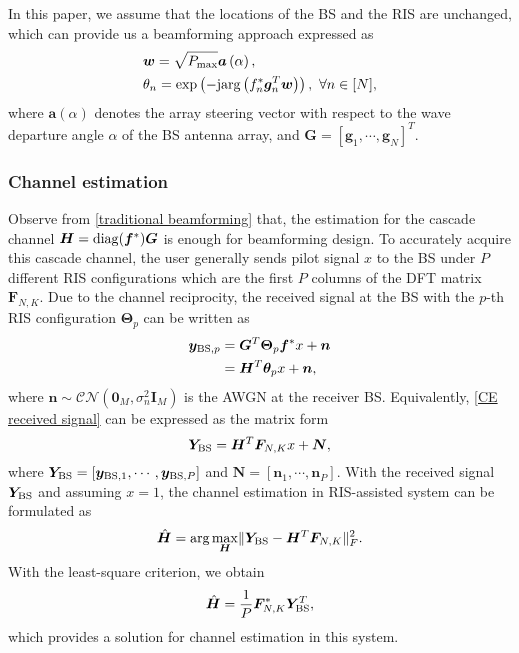 \documentclass[12pt,draftclsnofoot,journal,onecolumn]{IEEEtran}
\theoremstyle{nonumberplain}
\def \exp {\text{exp}}
\def \arg {\text{arg}}
\begin{document}
        
        In this paper, we assume that the locations of the \ac{BS} and the RIS are unchanged, which can provide us a beamforming approach expressed as
                \begin{subequations}
\label{traditional beamforming}
\begin{align}
\label{w_optimal}
&\bm w=\sqrt{P_{\rm max}}\bm a\left(\alpha\right),\\
\label{theta_optimal}
&\theta_{n} = \exp\left(-{\rm j} \arg\left(f_{n}^{*}\bm g_{n}^{T}\bm w\right)\right),~\forall n\in [N],
\end{align}
\end{subequations}
where $\bm a(\alpha)$ denotes the array steering vector with respect to the wave departure angle $\alpha$ of the BS antenna array, and $\bm G = \left[\bm g_{1}, \cdots, \bm g_{N}\right]^{T}$.

\subsubsection{Channel estimation}
Observe from \eqref{traditional beamforming} that, the estimation for the cascade channel ${\bm H} = {\rm diag}({\bm f}^{*})\bm G$ is enough for beamforming design.
To accurately acquire this cascade channel, the user generally sends pilot signal $x$ to the BS under $P$ different RIS configurations which are the first $P$ columns of the DFT matrix $\bm F_{N,K}$. Due to the channel reciprocity, the received signal at the BS with the $p$-th RIS configuration $\bm \Theta_{p}$ can be written as \cite{atapattu2020reconfigurable}
    \begin{equation}
    \label{CE received signal}
    \begin{aligned}
            {\bm y}_{{\rm BS}, p} &={\bm G}^{T} {\bm \Theta}_p\bm f^{*} x+\bm n
            \\&=\bm H^{T} {\bm \theta}_p x+\bm n,
    \end{aligned}
    \end{equation}
    where $\bm n\sim \mathcal{CN}\left( \bm 0_{M}, \sigma_{n}^{2}\bm I_{M}\right)$ is the \ac{AWGN} at the receiver BS.
Equivalently, \eqref{CE received signal} can be expressed as the matrix form
    \begin{equation}
    \label{eqn:MMSE_CE}
        {\bm Y}_{\rm BS}=\bm H^{T} \bm F_{N,K}x + {\bm N},
    \end{equation}
    where ${\bm Y}_{\rm BS}=\left[\bm y_{{\rm BS}, 1},\cdots,\bm y_{{\rm BS}, P}\right]$ and $\bm N = \left[ \bm n_{1},\cdots,\bm n_{P}\right]$.
With the received signal $\bm Y_{\rm BS}$ and assuming $x=1$, the channel estimation in RIS-assisted system can be formulated as 
    \begin{equation}
        \hat{\bm H} = \arg\max_{\bm H} \lVert {\bm Y}_{\rm BS} - {\bm H^{T}} {\bm F}_{N,K}\rVert_{F}^2.
    \end{equation}
    With the least-square criterion, we obtain
    \begin{equation}
        \hat{\bm H} = \frac{1}{P}{\bm F}_{N,K}^{*}{\bm Y}_{\rm BS}^{T},
        \label{eqn:MMSE-CE}
    \end{equation}
    which provides a solution for channel estimation in this system.
\end{document}
